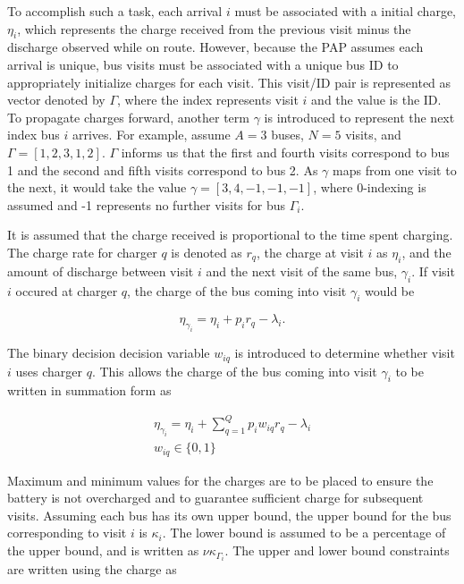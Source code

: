 \documentclass[letterpaper, 10pt, conference]{IEEEtran}
\begin{document}
To accomplish such a task, each arrival \(i\) must be associated with a initial charge, \(\eta_i\), which represents the charge received from the previous visit minus the discharge observed while on route. However, because the PAP assumes each arrival is unique, bus visits must be associated with a unique bus ID to appropriately initialize charges for each visit. This visit/ID pair is represented as vector denoted by \(\Gamma\), where the index represents visit \(i\) and the value is the ID. To propagate charges forward, another term \(\gamma\) is introduced to represent the next index bus \(i\) arrives. For example, assume \(A = 3\) buses, \(N = 5\) visits, and \(\Gamma = [1,2,3,1,2]\). \(\Gamma\) informs us that the first and fourth visits correspond to bus 1 and the second and fifth visits correspond to bus 2. As \(\gamma\) maps from one visit to the next, it would take the value \(\gamma = [3,4,-1,-1,-1]\), where 0-indexing is assumed and -1 represents no further visits for bus \(\Gamma_i\).

It is assumed that the charge received is proportional to the time spent charging. The charge rate for charger $q$ is denoted as $r_q$, the charge at visit $i$ as $\eta_i$, and the amount of discharge between visit $i$ and the next visit of the same bus, $\gamma_i$. If visit $i$ occured at charger $q$, the charge of the bus coming into visit $\gamma_i$ would be

\begin{equation}
	\eta_{\gamma_i} = \eta_i + p_i r_q - \lambda_i.
\end{equation}

The binary decision decision variable $w_{iq}$ is introduced to determine whether visit $i$ uses charger $q$. This allows the charge of the bus coming into visit $\gamma_i$ to be written in summation form as

\begin{subequations}
\begin{align}
    \eta_{\gamma_i} = \eta_i + \sum_{q=1}^Q p_i w_{iq} r_q - \lambda_i \\
    w_{iq} \in \{0,1\}
\end{align}
\end{subequations}

Maximum and minimum values for the charges are to be placed to ensure the battery is not overcharged and to guarantee sufficient charge for subsequent visits. Assuming each bus has its own upper bound, the upper bound for the bus corresponding to visit \(i\) is \(\kappa_i\). The lower bound is assumed to be a percentage of the upper bound, and is written as \(\nu \kappa_{\Gamma_i}\). The upper and lower bound constraints are written using the charge as
\end{document}
